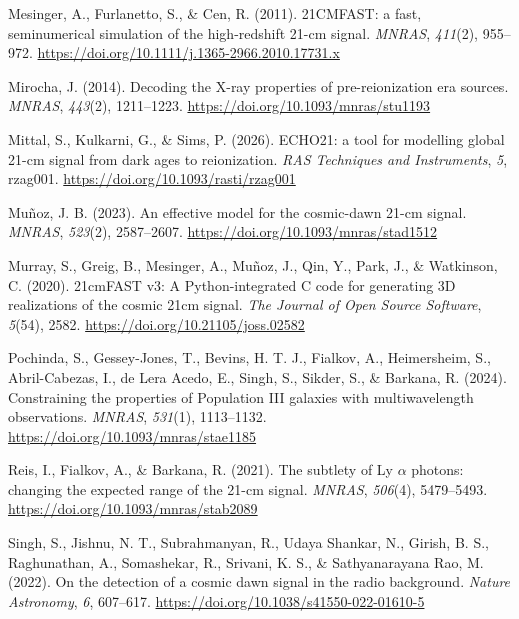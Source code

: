 \documentclass[
]{article}
\newlength{\cslhangindent}
\newenvironment{CSLReferences}[2] %
 {\begin{list}{}{%
  \setlength{\itemindent}{0pt}
  \setlength{\leftmargin}{0pt}
  \setlength{\parsep}{0pt}
  \ifodd #1
   \setlength{\leftmargin}{\cslhangindent}
   \setlength{\itemindent}{-1\cslhangindent}
  \fi
  \setlength{\itemsep}{#2\baselineskip}}}
 {\end{list}}
\begin{document}
\begin{CSLReferences}{1}{0}
Mesinger, A., Furlanetto, S., \& Cen, R. (2011). {21CMFAST: a fast,
seminumerical simulation of the high-redshift 21-cm signal}.
\emph{MNRAS}, \emph{411}(2), 955--972.
\url{https://doi.org/10.1111/j.1365-2966.2010.17731.x}

Mirocha, J. (2014). {Decoding the X-ray properties of pre-reionization
era sources}. \emph{MNRAS}, \emph{443}(2), 1211--1223.
\url{https://doi.org/10.1093/mnras/stu1193}

Mittal, S., Kulkarni, G., \& Sims, P. (2026). {ECHO21: a tool for
modelling global 21-cm signal from dark ages to reionization}. \emph{RAS
Techniques and Instruments}, \emph{5}, rzag001.
\url{https://doi.org/10.1093/rasti/rzag001}

Muñoz, J. B. (2023). {An effective model for the cosmic-dawn 21-cm
signal}. \emph{MNRAS}, \emph{523}(2), 2587--2607.
\url{https://doi.org/10.1093/mnras/stad1512}

Murray, S., Greig, B., Mesinger, A., Muñoz, J., Qin, Y., Park, J., \&
Watkinson, C. (2020). {21cmFAST v3: A Python-integrated C code for
generating 3D realizations of the cosmic 21cm signal.} \emph{The Journal
of Open Source Software}, \emph{5}(54), 2582.
\url{https://doi.org/10.21105/joss.02582}

Pochinda, S., Gessey-Jones, T., Bevins, H. T. J., Fialkov, A.,
Heimersheim, S., Abril-Cabezas, I., de Lera Acedo, E., Singh, S.,
Sikder, S., \& Barkana, R. (2024). {Constraining the properties of
Population III galaxies with multiwavelength observations}.
\emph{MNRAS}, \emph{531}(1), 1113--1132.
\url{https://doi.org/10.1093/mnras/stae1185}

Reis, I., Fialkov, A., \& Barkana, R. (2021). {The subtlety of Ly
{\(\alpha\)} photons: changing the expected range of the 21-cm signal}.
\emph{MNRAS}, \emph{506}(4), 5479--5493.
\url{https://doi.org/10.1093/mnras/stab2089}

Singh, S., Jishnu, N. T., Subrahmanyan, R., Udaya Shankar, N., Girish,
B. S., Raghunathan, A., Somashekar, R., Srivani, K. S., \&
Sathyanarayana Rao, M. (2022). {On the detection of a cosmic dawn signal
in the radio background}. \emph{Nature Astronomy}, \emph{6}, 607--617.
\url{https://doi.org/10.1038/s41550-022-01610-5}


\end{CSLReferences}
\end{document}
